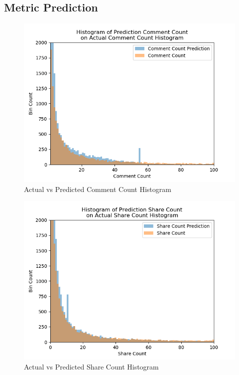 \documentclass{article}
\begin{document}
\subsection{Metric Prediction}

\begin{figure}
\centering
\includegraphics[width=\columnwidth]{images/Comment_Count_Prediction_vs_Actual.png}
\caption{Actual vs Predicted Comment Count Histogram}
\label{comment_count_histogram}
\end{figure}

\begin{figure}
\centering
\includegraphics[width=\columnwidth]{images/Share_Count_Prediction_vs_Actual.png}
\caption{Actual vs Predicted Share Count Histogram}
\label{share_count_histogram}
\end{figure}
\end{document}
